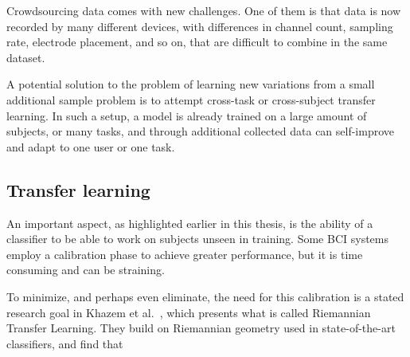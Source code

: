     Crowdsourcing data comes with new challenges. One of them is that data is now recorded by many different devices, with differences in channel count, sampling rate, electrode placement, and so on, that are difficult to combine in the same dataset. 

    A potential solution to the problem of learning new variations from a small additional sample problem is to attempt cross-task or cross-subject transfer learning. In such a setup, a model is already trained on a large amount of subjects, or many tasks, and through additional collected data can self-improve and adapt to one user or one task.



\subsection{Transfer learning}

An important aspect, as highlighted earlier in this thesis, is the ability of a classifier to be able to work on subjects unseen in training. Some BCI systems employ a calibration phase to achieve greater performance, but it is time consuming and can be straining. 

To minimize, and perhaps even eliminate, the need for this calibration is a stated research goal in Khazem et al.~\cite{khazem_minimizing_2021}, which presents what is called Riemannian Transfer Learning. They build on Riemannian geometry used in state-of-the-art classifiers, and find that
